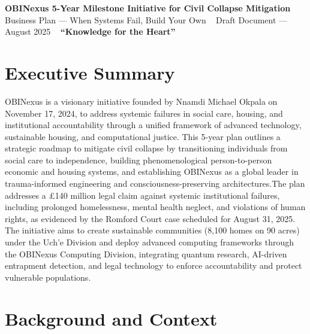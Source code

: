 \documentclass[12pt]{article}\usepackage[a4paper,margin=1in]{geometry}
\begin{document}
\begin{center}
    {\LARGE \textbf{OBINexus 5-Year Milestone Initiative for Civil Collapse Mitigation}} \
    \vspace{0.5em}
    {\large Business Plan --- When Systems Fail, Build Your Own} \
    \vspace{0.5em}
    {\large Draft Document --- August 2025} \
    \vspace{1em}
    {\textbf{``Knowledge for the Heart''}} \
\end{center}\section*{Executive Summary}
OBINexus is a visionary initiative founded by Nnamdi Michael Okpala on November 17, 2024, to address systemic failures in social care, housing, and institutional accountability through a unified framework of advanced technology, sustainable housing, and computational justice. This 5-year plan outlines a strategic roadmap to mitigate civil collapse by transitioning individuals from social care to independence, building phenomenological person-to-person economic and housing systems, and establishing OBINexus as a global leader in trauma-informed engineering and consciousness-preserving architectures.The plan addresses a £140 million legal claim against systemic institutional failures, including prolonged homelessness, mental health neglect, and violations of human rights, as evidenced by the Romford Court case scheduled for August 31, 2025. The initiative aims to create sustainable communities (8,100 homes on 90 acres) under the Uch'e Division and deploy advanced computing frameworks through the OBINexus Computing Division, integrating quantum research, AI-driven entrapment detection, and legal technology to enforce accountability and protect vulnerable populations.\section*{Background and Context}
\end{document}

